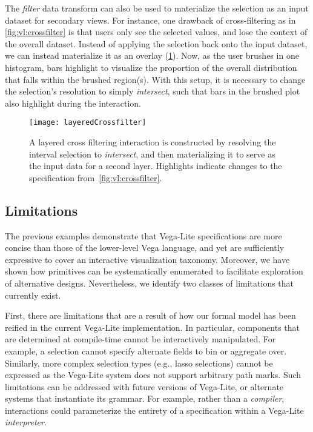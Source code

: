 The \emph{filter} data transform can also be used to materialize the selection
as an input dataset for secondary views. For instance, one drawback of
cross-filtering as in \cref{fig:vl:crossfilter} is that users only see the
selected values, and lose the context of the overall dataset. Instead of
applying the selection back onto the input dataset, we can instead materialize
it as an overlay (\cref{fig:vl:layeredCrossfilter}). Now, as the user brushes in
one histogram, bars highlight to visualize the proportion of the overall
distribution that falls within the brushed region(s). With this setup, it is
necessary to change the selection's resolution to simply \emph{intersect}, such
that bars in the brushed plot also highlight during the interaction.

\begin{figure}[h!]
  \centering
  \texttt{[image: layeredCrossfilter]}
  \caption{A layered cross filtering interaction is constructed by resolving
  the interval selection to \emph{intersect}, and then materializing it to
  serve as the input data for a second layer. Highlights indicate changes to
  the specification from~\cref{fig:vl:crossfilter}.}
  \label{fig:vl:layeredCrossfilter}
\end{figure}

\subsection{Limitations}

The previous examples demonstrate that Vega-Lite specifications are more concise
than those of the lower-level Vega language, and yet are sufficiently expressive
to cover an interactive visualization taxonomy. Moreover, we have shown how
primitives can be systematically enumerated to facilitate exploration of
alternative designs. Nevertheless, we identify two classes of limitations that
currently exist.

First, there are limitations that are a result of how our formal model has been
reified in the current Vega-Lite implementation. In particular, components that
are determined at compile-time cannot be interactively manipulated. For example,
a selection cannot specify alternate fields to bin or aggregate over. Similarly,
more complex selection types (e.g., lasso selections) cannot be expressed as the
Vega-Lite system does not support arbitrary path marks. Such limitations can be
addressed with future versions of Vega-Lite, or alternate systems that
instantiate its grammar. For example, rather than a \emph{compiler},
interactions could parameterize the entirety of a specification within a
Vega-Lite \emph{interpreter}.

